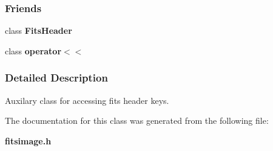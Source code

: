 \subsubsection*{Friends}
\begin{CompactItemize}
\item 
class {\bf Fits\-Header}
\item 
class {\bf operator$<$$<$}
\end{CompactItemize}


\subsubsection{Detailed Description}
Auxilary class for accessing fits header keys.



The documentation for this class was generated from the following file:\begin{CompactItemize}
\item 
{\bf fitsimage.h}\end{CompactItemize}
